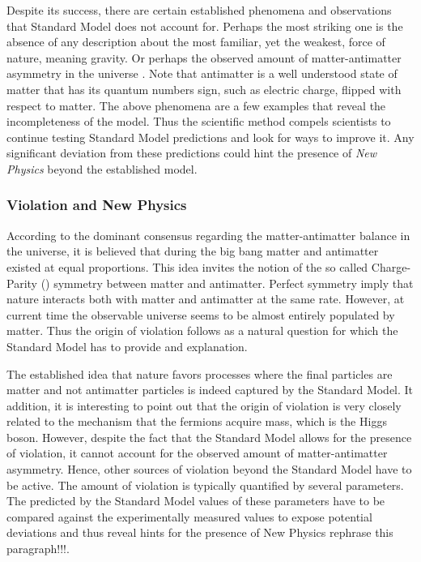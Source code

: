 Despite its success, there are certain established phenomena and observations that Standard
Model does not account for. Perhaps the most striking one is the absence of any description about the most familiar,
yet the weakest, force of nature, meaning gravity. Or perhaps the observed amount of matter-antimatter
asymmetry in the universe \cite{more-cpv-huet,more-cpv-gavela_I,more-cpv-gavela_II}.
Note that antimatter is a well understood state of matter that has its quantum numbers sign,
such as electric charge, flipped with respect to matter. The above phenomena are a few
examples that reveal the incompleteness of the model. Thus the scientific method compels
scientists to continue testing Standard Model predictions and look for ways to improve it.
Any significant deviation from these predictions could hint the presence of
{\it New Physics} beyond the established model.

\subsubsection{\CP Violation and New Physics}
According to the dominant consensus regarding the matter-antimatter balance in the
universe, it is believed that during the big bang matter and antimatter existed at
equal proportions. This idea invites the notion of the so called Charge-Parity (\CP)
symmetry between matter and antimatter. Perfect \CP symmetry imply that nature
interacts both with matter and antimatter at the same rate.
However, at current time the observable universe seems to be almost entirely populated by
matter. Thus the origin of \CP violation follows as a natural question for which the
Standard Model has to provide and explanation.

The established idea that nature favors processes where the final particles are matter
and not antimatter particles is indeed captured by the Standard Model. It addition, it
is interesting to point out that the origin of \CP violation is very closely related
to the mechanism that the fermions acquire mass, which is the Higgs boson. However,
despite the fact that the Standard Model allows for the presence of \CP violation,
it cannot account for the observed amount of matter-antimatter asymmetry.
Hence, other sources of \CP violation beyond the Standard Model have to be active.
The amount of \CP violation is typically quantified by several parameters.
The predicted by the Standard Model values of these parameters have to be compared
against the experimentally measured values to expose potential deviations and thus
reveal hints for the presence of New Physics {\color{red} rephrase this paragraph!!!}.

